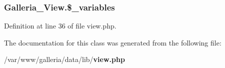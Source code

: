 \subsubsection{\setlength{\rightskip}{0pt plus 5cm}Galleria\_\-View.\$\_\-variables\hspace{0.3cm}{\tt  [protected]}}\label{classGalleria__View_57876325f1255ea5a0dd5474e8142cf2}




Definition at line 36 of file view.php.

The documentation for this class was generated from the following file:\begin{CompactItemize}
\item 
/var/www/galleria/data/lib/{\bf view.php}\end{CompactItemize}
